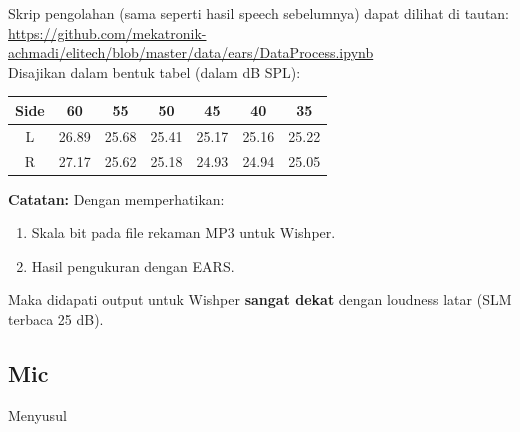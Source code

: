 \documentclass[12pt,]{article}
\begin{document}
	Skrip pengolahan (sama seperti hasil speech sebelumnya) dapat dilihat di tautan:\\
	\url{https://github.com/mekatronik-achmadi/elitech/blob/master/data/ears/DataProcess.ipynb}\\
	
	Disajikan dalam bentuk tabel (dalam dB SPL):
	\begin{center}
		\begin{tabular}{|c|c|c|c|c|c|c|}
			\hline
			Side & 60 & 55 & 50 & 45 & 40 & 35\\ [0.5ex]
			\hline\hline
			L & 26.89 & 25.68 & 25.41 & 25.17 & 25.16 & 25.22 \\
			\hline
			R & 27.17 & 25.62 & 25.18 & 24.93 & 24.94 & 25.05 \\
			\hline
		\end{tabular}
	\end{center}

	\textbf{Catatan:} Dengan memperhatikan:
	\begin{enumerate}
		\item Skala bit pada file rekaman MP3 untuk Wishper.
		\item Hasil pengukuran dengan EARS.
	\end{enumerate}

	Maka didapati output untuk Wishper \textbf{sangat dekat} dengan loudness latar (SLM terbaca 25 dB).
	
	\subsection{Mic}
	
	Menyusul
\end{document}
